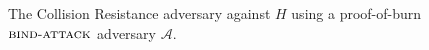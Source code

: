 \begin{figure}[t]
\begin{algorithm}[H]
    \caption{\label{alg.collision-resistance-adversary} The Collision Resistance adversary against $H$ using a proof-of-burn $\textsc{bind}\-\text{-}\-\textsc{attack}$ adversary $\mathcal{A}$.}
    \begin{algorithmic}[1]
            \State{}
        \EndFunction
    \end{algorithmic}
\end{algorithm}
\end{figure}
